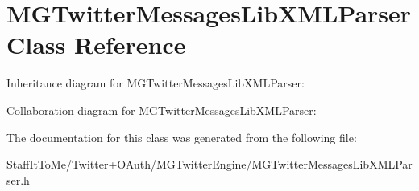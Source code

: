 \hypertarget{interface_m_g_twitter_messages_lib_x_m_l_parser}{
\section{\-M\-G\-Twitter\-Messages\-Lib\-X\-M\-L\-Parser \-Class \-Reference}
\label{interface_m_g_twitter_messages_lib_x_m_l_parser}
}


\-Inheritance diagram for \-M\-G\-Twitter\-Messages\-Lib\-X\-M\-L\-Parser\-:


\-Collaboration diagram for \-M\-G\-Twitter\-Messages\-Lib\-X\-M\-L\-Parser\-:


\-The documentation for this class was generated from the following file\-:\begin{DoxyCompactItemize}
\item 
\-Staff\-It\-To\-Me/\-Twitter+\-O\-Auth/\-M\-G\-Twitter\-Engine/\-M\-G\-Twitter\-Messages\-Lib\-X\-M\-L\-Parser.\-h\end{DoxyCompactItemize}
